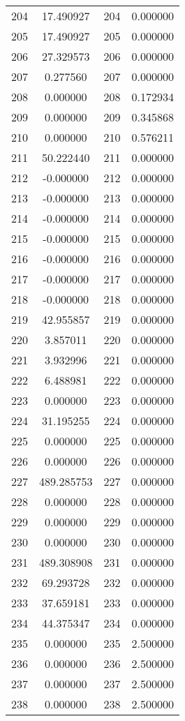 \documentclass[12pt]{article}
\begin{document}
\begin{longtable}{@{}cccc@{}}
204 & 17.490927 & 204 & 0.000000 \\
205 & 17.490927 & 205 & 0.000000 \\
206 & 27.329573 & 206 & 0.000000 \\
207 & 0.277560 & 207 & 0.000000 \\
208 & 0.000000 & 208 & 0.172934 \\
209 & 0.000000 & 209 & 0.345868 \\
210 & 0.000000 & 210 & 0.576211 \\
211 & 50.222440 & 211 & 0.000000 \\
212 & -0.000000 & 212 & 0.000000 \\
213 & -0.000000 & 213 & 0.000000 \\
214 & -0.000000 & 214 & 0.000000 \\
215 & -0.000000 & 215 & 0.000000 \\
216 & -0.000000 & 216 & 0.000000 \\
217 & -0.000000 & 217 & 0.000000 \\
218 & -0.000000 & 218 & 0.000000 \\
219 & 42.955857 & 219 & 0.000000 \\
220 & 3.857011 & 220 & 0.000000 \\
221 & 3.932996 & 221 & 0.000000 \\
222 & 6.488981 & 222 & 0.000000 \\
223 & 0.000000 & 223 & 0.000000 \\
224 & 31.195255 & 224 & 0.000000 \\
225 & 0.000000 & 225 & 0.000000 \\
226 & 0.000000 & 226 & 0.000000 \\
227 & 489.285753 & 227 & 0.000000 \\
228 & 0.000000 & 228 & 0.000000 \\
229 & 0.000000 & 229 & 0.000000 \\
230 & 0.000000 & 230 & 0.000000 \\
231 & 489.308908 & 231 & 0.000000 \\
232 & 69.293728 & 232 & 0.000000 \\
233 & 37.659181 & 233 & 0.000000 \\
234 & 44.375347 & 234 & 0.000000 \\
235 & 0.000000 & 235 & 2.500000 \\
236 & 0.000000 & 236 & 2.500000 \\
237 & 0.000000 & 237 & 2.500000 \\
238 & 0.000000 & 238 & 2.500000 \\

\end{longtable}
\end{document}
